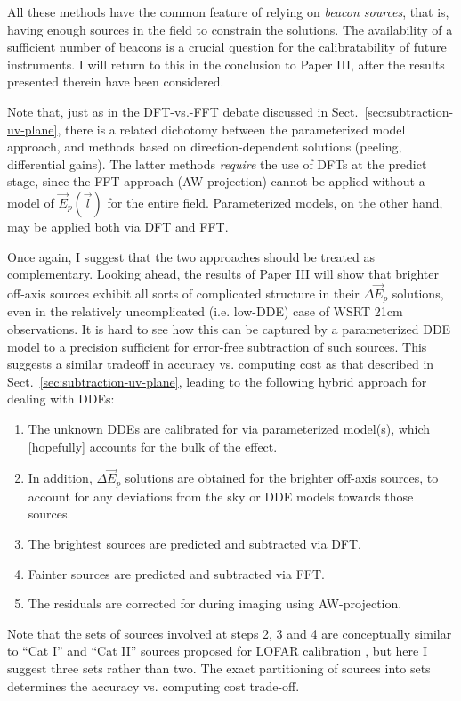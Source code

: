 \documentclass[referee]{aa}
\newcommand{\jones}[2]{\vec {#1}_{#2}}
\begin{document}
All these methods have the common feature of relying on \emph{beacon sources}, that is, having enough sources in the field to constrain the solutions. The availability of a sufficient number of beacons is a crucial question for the calibratability of future instruments. I will return to this in the conclusion to Paper III, after the results presented therein have been considered.

Note that, just as in the DFT-vs.-FFT debate discussed in Sect.~\ref{sec:subtraction-uv-plane}, there is a related dichotomy between the parameterized model approach, and methods based on direction-dependent solutions (peeling, differential gains). The latter methods {\em require} the use of DFTs at the predict stage, since the FFT approach (AW-projection) cannot be applied without a model of $\jones{E}{p}(\vec l)$ for the entire field. Parameterized models, on the other hand, may be applied both via DFT and FFT. 

Once again, I suggest that the two approaches should be treated as complementary. Looking ahead, the results of Paper III will show that brighter off-axis sources exhibit all sorts of complicated structure in their $\Delta\jones{E}{p}$ solutions, even in the relatively uncomplicated (i.e. low-DDE) case of WSRT 21cm observations. It is hard to see how this can be captured by a parameterized DDE model to a precision sufficient for error-free subtraction of such sources. This suggests a similar tradeoff in accuracy vs. computing cost as that described in Sect.~\ref{sec:subtraction-uv-plane}, leading to the following hybrid approach for dealing with DDEs:

\begin{enumerate}
\item The unknown DDEs are calibrated for via parameterized model(s), which [hopefully] accounts for the bulk of the effect.
\item In addition, $\Delta\jones{E}{p}$ solutions are obtained for the brighter off-axis sources, to account for any deviations from the sky or DDE models towards those sources.
\item The brightest sources are predicted and subtracted via DFT. 
\item Fainter sources are predicted and subtracted via FFT.
\item The residuals are corrected for during imaging using AW-projection.
\end{enumerate}

Note that the sets of sources involved at steps 2, 3 and 4 are conceptually similar to ``Cat I'' and ``Cat II'' sources proposed for LOFAR calibration \citep{JEN:LOFAR3}, but here I suggest three sets rather than two. The exact partitioning of sources into sets determines the accuracy vs. computing cost trade-off.
\end{document}
